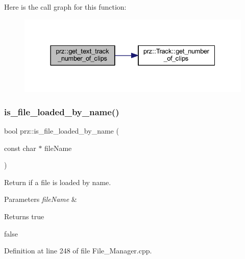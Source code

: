 Here is the call graph for this function\+:
\nopagebreak
\begin{figure}[H]
\begin{center}
\leavevmode
\includegraphics[width=331pt]{namespaceprz_a479605aa22a06a3128174b575a312da7_cgraph}
\end{center}
\end{figure}
\mbox{\label{namespaceprz_a60a210bc0ab0675f0096a17f18420c7b}} 
\subsubsection{\texorpdfstring{is\_file\_loaded\_by\_name()}{is\_file\_loaded\_by\_name()}}
{\footnotesize\ttfamily bool prz\+::is\+\_\+file\+\_\+loaded\+\_\+by\+\_\+name (\begin{DoxyParamCaption}\item[{const char $\ast$}]{file\+Name }\end{DoxyParamCaption})}



Return if a file is loaded by name. 


\begin{DoxyParams}{Parameters}
{\em file\+Name} & \\
\hline
\end{DoxyParams}
\begin{DoxyReturn}{Returns}
true 

false 
\end{DoxyReturn}


Definition at line 248 of file File\+\_\+\+Manager.\+cpp.

